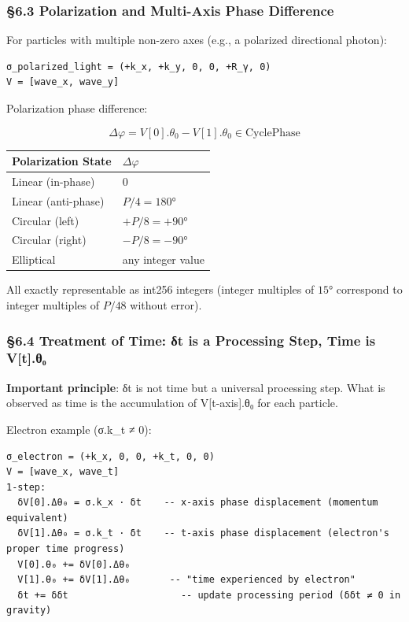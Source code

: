 \documentclass[a4paper,11pt]{article}
\newcounter{none}
\begin{document}
\subsubsection{§6.3 Polarization and Multi-Axis Phase
Difference}\label{polarization-and-multi-axis-phase-difference}

For particles with multiple non-zero axes (e.g., a polarized directional
photon):

\begin{verbatim}
σ_polarized_light = (+k_x, +k_y, 0, 0, +R_γ, 0)
V = [wave_x, wave_y]
\end{verbatim}

Polarization phase difference:

\[\Delta\varphi = V[0].\theta_0 - V[1].\theta_0 \in \text{CyclePhase}\]

{\def\LTcaptype{none} %
\begin{longtable}[]{@{}ll@{}}
\toprule\noalign{}
Polarization State & \(\Delta\varphi\) \\
\midrule\noalign{}
\endhead
\bottomrule\noalign{}
\endlastfoot
Linear (in-phase) & \(0\) \\
Linear (anti-phase) & \(P/4 = 180°\) \\
Circular (left) & \(+P/8 = +90°\) \\
Circular (right) & \(-P/8 = -90°\) \\
Elliptical & any integer value \\
\end{longtable}
}

All exactly representable as int256 integers (integer multiples of
\(15°\) correspond to integer multiples of \(P/48\) without error).

\subsubsection{§6.4 Treatment of Time: δt is a Processing Step, Time is
V{[}t{]}.θ₀}\label{treatment-of-time-ux3b4t-is-a-processing-step-time-is-vt.ux3b8ux2080}

\textbf{Important principle}: δt is not time but a universal processing
step. What is observed as time is the accumulation of V{[}t-axis{]}.θ₀
for each particle.

Electron example (σ.k\_t ≠ 0):

\begin{verbatim}
σ_electron = (+k_x, 0, 0, +k_t, 0, 0)
V = [wave_x, wave_t]
1-step:
  δV[0].Δθ₀ = σ.k_x · δt    -- x-axis phase displacement (momentum equivalent)
  δV[1].Δθ₀ = σ.k_t · δt    -- t-axis phase displacement (electron's proper time progress)
  V[0].θ₀ += δV[0].Δθ₀
  V[1].θ₀ += δV[1].Δθ₀       -- "time experienced by electron"
  δt += δδt                    -- update processing period (δδt ≠ 0 in gravity)
\end{verbatim}
\end{document}
